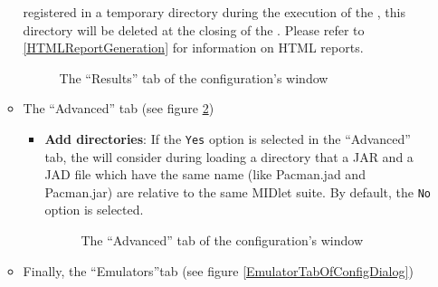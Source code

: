 \begin{itemize}
\begin{itemize}
{       registered in a temporary directory during the execution of the \ma, this
       directory will be deleted at the closing of the \ma. Please refer to
       \ref{HTMLReportGeneration} for information on HTML reports. \begin{figure}[ht]
			\begin{center}
			\end{center}
			\caption{The ``Results'' tab of the configuration's window}
			\label{ResultsTabOfConfigDialog}
	   	\end{figure}
	  }
  \item The ``Advanced'' tab (see figure \ref{AdvancedTabOfConfigDialog})
  	\begin{itemize}
       \item \textbf{Add directories}: If the \texttt{Yes} option is selected
       in the ``Advanced'' tab, the \ma will consider during loading a directory
       that a JAR and a JAD file which have the same name (like Pacman.jad and
       Pacman.jar) are relative to the same MIDlet suite. By default, the
       \texttt{No} option is selected.
       \begin{figure}[ht]
			\begin{center}
			\end{center}
			\caption{The ``Advanced'' tab of the configuration's window}
			\label{AdvancedTabOfConfigDialog}
	   	\end{figure}
      \end{itemize}
  \item Finally, the ``Emulators''tab (see figure \ref{EmulatorTabOfConfigDialog})
		

\end{itemize}
\end{itemize}
